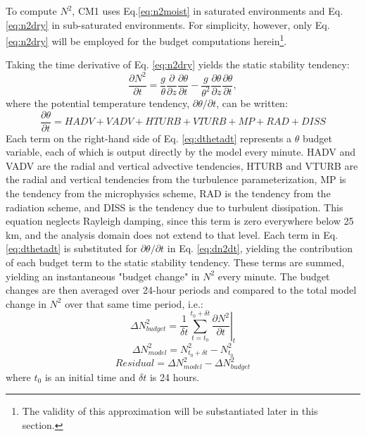 \documentclass{ametsoc}
\begin{document}
To compute $N^2$, CM1 uses Eq.\ref{eq:n2moist} in saturated environments and Eq. \ref{eq:n2dry} in sub-saturated environments. For simplicity, however, only Eq. \ref{eq:n2dry} will be employed for the budget computations herein\footnote{The validity of this approximation will be substantiated later in this section.}.

Taking the time derivative of Eq. \ref{eq:n2dry} yields the static stability tendency:
   \begin{equation} \label{eq:dn2dt}
   \frac{\partial N^2}{\partial t} = \frac{g}{\theta}\frac{\partial}{\partial z}\frac{\partial \theta}{\partial t}-\frac{g}{\theta^2}\frac{\partial \theta}{\partial z}\frac{\partial \theta}{\partial t},
   \end{equation}
where the potential temperature tendency, $\partial \theta/\partial t$, can be written:
   \begin{equation} \label{eq:dthetadt}
   \frac{\partial \theta}{\partial t} = HADV+VADV+HTURB+VTURB+MP+RAD+DISS 
   \end{equation}
Each term on the right-hand side of Eq. \ref{eq:dthetadt} represents a $\theta$ budget variable, each of which is output directly by the model every minute.
HADV and VADV are the radial and vertical advective tendencies, HTURB and VTURB are the radial and vertical tendencies from the turbulence parameterization, MP is the tendency from the microphysics scheme, RAD is the tendency from the radiation scheme, and DISS is the tendency due to turbulent dissipation.
This equation neglects Rayleigh damping, since this term is zero everywhere below 25 km, and the analysis domain does not extend to that level.
Each term in Eq. \ref{eq:dthetadt} is substituted for ${\partial \theta}/{\partial t}$ in Eq. \ref{eq:dn2dt}, yielding the contribution of each budget term to the static stability tendency.
These terms are summed, yielding an instantaneous "budget change" in $N^2$ every minute.
The budget changes are then averaged over 24-hour periods and compared to the total model change in $N^2$ over that same time period, i.e.:
   \begin{equation} \label{eq:budgetchange}
   \Delta N^2_{budget} = \frac{1}{\delta t}\sum_{t=t_0}^{t_0+\delta t} \left.\frac{\partial N^2}{\partial t}\right\vert_t
   \end{equation}
   \begin{equation} \label{eq:modelchange}
   \Delta N^2_{model} = N^2_{t_0+\delta t}-N^2_{t_0}
   \end{equation}
   \begin{equation} \label{eq:residual}
   Residual = \Delta N^2_{model}-\Delta N^2_{budget}
   \end{equation}
where $t_0$ is an initial time and $\delta t$ is 24 hours.
\end{document}
